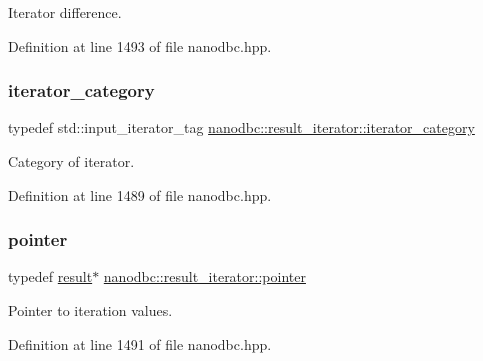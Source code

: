 Iterator difference. 



Definition at line 1493 of file nanodbc.\+hpp.

\mbox{\label{classnanodbc_1_1result__iterator_af46c41cf24ac2db0574486dc2b88c848}} 
\subsubsection{\texorpdfstring{iterator\_category}{iterator\_category}}
{\footnotesize\ttfamily typedef std\+::input\+\_\+iterator\+\_\+tag \mbox{\hyperlink{classnanodbc_1_1result__iterator_af46c41cf24ac2db0574486dc2b88c848}{nanodbc\+::result\+\_\+iterator\+::iterator\+\_\+category}}}



Category of iterator. 



Definition at line 1489 of file nanodbc.\+hpp.

\mbox{\label{classnanodbc_1_1result__iterator_a49329c62a4366740ff86be23ca1eef0d}} 
\subsubsection{\texorpdfstring{pointer}{pointer}}
{\footnotesize\ttfamily typedef \mbox{\hyperlink{classnanodbc_1_1result}{result}}$\ast$ \mbox{\hyperlink{classnanodbc_1_1result__iterator_a49329c62a4366740ff86be23ca1eef0d}{nanodbc\+::result\+\_\+iterator\+::pointer}}}



Pointer to iteration values. 



Definition at line 1491 of file nanodbc.\+hpp.

\mbox{\label{classnanodbc_1_1result__iterator_aeca21fe535e223231562d96a76c5ee92}} 
